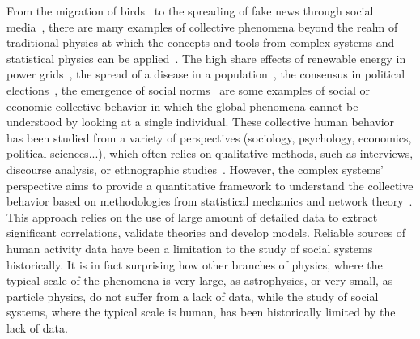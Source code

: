 From the migration of birds~\cite{roche-1997} to the spreading of fake news through social media~\cite{yamir-2004,vosoughi-2018}, there are many examples of collective phenomena beyond the realm of traditional physics at which the concepts and tools from complex systems and statistical physics can be applied~\cite{perc2013evolutionary}. The high share effects of renewable energy in power grids~\cite{maria-2023}, the spread of a disease in a population~\cite{anderson1991infectious}, the consensus in political elections~\cite{anderson-2000}, the emergence of social norms~\cite{ellickson-1999} are some examples of social or economic collective behavior in which the global phenomena cannot be understood by looking at a single individual. These collective human behavior has been studied from a variety of perspectives (sociology, psychology, economics, political sciences...), which often relies on qualitative methods, such as interviews, discourse analysis, or ethnographic studies~\cite{bryman-2010}. However, the complex systems' perspective aims to provide a quantitative framework to understand the collective behavior based on methodologies from statistical mechanics and network theory~\cite{newman-book,barabasi-2013}. This approach relies on the use of large amount of detailed data to extract significant correlations, validate theories and develop models. Reliable sources of human activity data have been a limitation to the study of social systems historically. It is in fact surprising how other branches of physics, where the typical scale of the phenomena is very large, as astrophysics, or very small, as particle physics, do not suffer from a lack of data, while the study of social systems, where the typical scale is human, has been historically limited by the lack of data.

